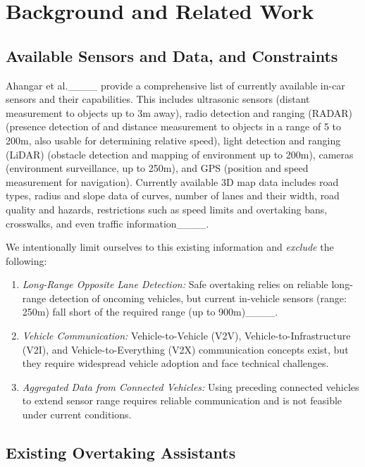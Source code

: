 \section{Background and Related Work}
\label{ref:relwork}
	\subsection{Available Sensors and Data, and Constraints}\label{subsec:sensors-available}
	Ahangar et al.____ provide a comprehensive list of currently available in-car sensors and their capabilities. 
	This includes 
	ultrasonic sensors (distant measurement to objects up to 3m away), radio detection and ranging (RADAR) (presence detection of and distance measurement to objects in a range of 5 to 200m, also usable for determining relative speed), light detection and ranging (LiDAR) (obstacle detection and mapping of environment up to 200m), cameras (environment surveillance, up to 250m), and GPS (position and speed measurement for navigation). 
	Currently available 3D map data includes road types, radius and slope data of curves, number of lanes and their width, road quality and hazards, restrictions such as speed limits and overtaking bans, crosswalks, and even traffic information____. 
	
	
	We intentionally limit ourselves to this existing information and %
	\textit{exclude} the following: 
	\begin{enumerate}
		\item \textit{Long-Range Opposite Lane Detection:} 
		Safe overtaking relies on reliable long-range detection of oncoming vehicles, but current in-vehicle sensors (range: 250m) fall short of the required range (up to 900m)____.
		\label{enum:constraints:range}
		
		\item \textit{Vehicle Communication:} Vehicle-to-Vehicle (V2V), Vehicle-to-Infrastructure (V2I), and Vehicle-to-Everything (V2X) communication concepts exist, but they require widespread vehicle adoption and face technical challenges. 
		
		\item \textit{Aggregated Data from Connected Vehicles:} Using preceding connected vehicles to extend sensor range requires reliable communication and is not feasible under current conditions.
	\end{enumerate}
	
	
	
	
	\subsection{Existing Overtaking Assistants}\label{subsec:existing-assis}
	
